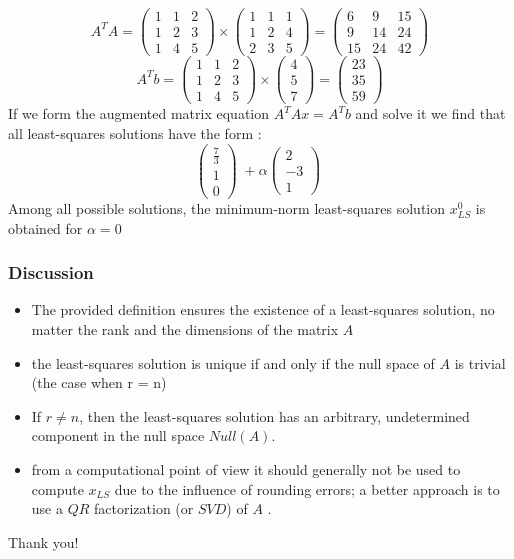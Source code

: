 \documentclass{beamer}
\begin{document}
\begin{frame}
	$$ A^{T}A = \begin{pmatrix}1 & 1 & 2 \\ 1& 2 & 3 \\ 1 & 4 & 5 \end{pmatrix} 
				 \times
			 \begin{pmatrix}1 & 1 & 1 \\ 1 & 2 & 4 \\ 2 & 3 & 5 \end{pmatrix} = 
				  \begin{pmatrix}6 & 9 & 15 \\ 9 & 14 & 24 \\ 15 & 24 & 42 \end{pmatrix} $$
		 \pause
$$ A^{T}b = \begin{pmatrix}1 & 1 & 2 \\ 1& 2 & 3 \\ 1 & 4 & 5 \end{pmatrix} 
				 \times
			 \begin{pmatrix}  4 \\ 5 \\ 7 \end{pmatrix} = 
				  \begin{pmatrix} 23 \\ 35 \\ 59 \end{pmatrix} $$
		 \pause
If we form the augmented matrix equation $A^{T}Ax = A^{T}b$ and solve it we find that all least-squares solutions have the form : 
	$$ \begin{pmatrix} \frac{7}{3}\\ 1 \\ 0 \end{pmatrix} \; +\alpha \begin{pmatrix} 2\\ -3 \\ 1 \end{pmatrix} \; $$
		 \pause
		Among all possible solutions, the minimum-norm least-squares solution $x_{LS}^{0}$ is obtained for $\alpha = 0$
 	
\end{frame}
\begin{frame}	
\frametitle{Discussion}
\begin{itemize}
	\item The provided definition ensures the existence of a least-squares solution, no matter the rank and the dimensions of the matrix $A$
		 \pause
	\item the least-squares solution is unique if and only if the null space of $A$ is trivial (the case when r = n) 
	\item If $r \neq n$, then the least-squares solution has an arbitrary, undetermined component in the null space $ Null(A)$.
		 \pause
	\item from a computational point of view it should generally not be used to compute $x_{LS}$ due to the influence of rounding errors; a better approach is to use a $QR$ factorization (or $SVD$) of $A$ .
	
\end{itemize}
\end{frame}

\begin{frame}
	\begin{center}
		Thank you!
	\end{center}
\end{frame}
\end{document}
